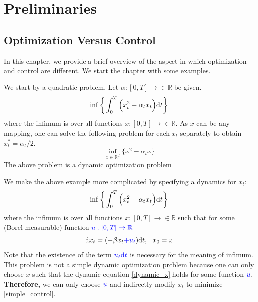 \documentclass[11pt]{book}
\newcommand{\dt}{\text{\normalfont d}t}
\newcommand{\dx}{\text{\normalfont d}x}
\begin{document}
\newpage
\setcounter{secnumdepth}{2}
\setcounter{page}{1}
\chapter{Preliminaries}
\section{Optimization Versus Control}
\label{sec:opt_control}
In this chapter, we provide a brief overview of the aspect in which optimization and control are different.  We start the chapter with some examples.
\begin{eg}\label{simple_optimization}
We start by a quadratic problem. Let $\alpha:[0,T]\to\in\mathbb{R}$ be given.
    \begin{equation}
        \inf\bigg\{\int_0^T\Big(x_t^2 - \alpha_t x_t\Big) {{\dt}}\bigg\}
    \end{equation}
where the infimum is over all functions $x:[0,T]\to\in\mathbb{R}$. As $x$ can be any mapping, one can solve the following problem for each $x_t$ separately to obtain $x^*_t=\alpha_t/2$.
    \begin{equation}
        \inf_{x\in\mathbb{R}^d}\bigg\{x^2 - \alpha_t x\bigg\}
    \end{equation}
The above problem is a dynamic optimization problem. 
\end{eg}
\begin{eg}
We make the above example more complicated by specifying a dynamics for $x_t$:
    \begin{equation}\label{simple_control}
        \inf\bigg\{\int_0^T\Big(x_t^2 - \alpha_t x_t\Big) {{\dt}}\bigg\}
    \end{equation}
where the infimum is over all functions $x:[0,T]\to\in\mathbb{R}$ such that for some (Borel measurable) function ${\color{blue} u:[0,T]\to\mathbb{R}}$
\begin{equation}\label{dynamic_x}
    {\dx}_t = (-\beta x_t  {\color{blue}+ u_t }) {{\dt}}, ~~ x_0=x
\end{equation}
Note that the existence of the term ${\color{blue} u_t {{\dt}}}$ is necessary for the meaning of infimum. This problem is not a simple dynamic optimization problem because one can only choose $x$ such that the dynamic equation \eqref{dynamic_x} holds for some function ${\color{blue} u}$. \textbf{Therefore,} we can only choose ${\color{blue} u}$ and indirectly modify $x_t$ to minimize \eqref{simple_control}.
\end{eg}
\end{document}
